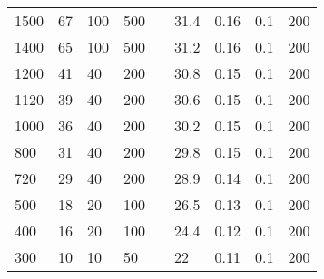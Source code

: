 \documentclass{article}
\begin{document}
\begin{table}[H]
\begin{tabular}{|l|l|l|l|l|l|l|l|l|}
        1500          & 67                        & 100                       & 500                       &  & 31.4       & 0.16                      & 0.1                       & 200                       \\ \cline{1-4} \cline{6-9}
        1400          & 65                        & 100                       & 500                       &  & 31.2       & 0.16                      & 0.1                       & 200                       \\ \cline{1-4} \cline{6-9}
        1200          & 41                        & 40                        & 200                       &  & 30.8       & 0.15                      & 0.1                       & 200                       \\ \cline{1-4} \cline{6-9}
        1120          & 39                        & 40                        & 200                       &  & 30.6       & 0.15                      & 0.1                       & 200                       \\ \cline{1-4} \cline{6-9}
        1000          & 36                        & 40                        & 200                       &  & 30.2       & 0.15                      & 0.1                       & 200                       \\ \cline{1-4} \cline{6-9}
        800           & 31                        & 40                        & 200                       &  & 29.8       & 0.15                      & 0.1                       & 200                       \\ \cline{1-4} \cline{6-9}
        720           & 29                        & 40                        & 200                       &  & 28.9       & 0.14                      & 0.1                       & 200                       \\ \cline{1-4} \cline{6-9}
        500           & 18                        & 20                        & 100                       &  & 26.5       & 0.13                      & 0.1                       & 200                       \\ \cline{1-4} \cline{6-9}
        400           & 16                        & 20                        & 100                       &  & 24.4       & 0.12                      & 0.1                       & 200                       \\ \cline{1-4} \cline{6-9}
        300           & 10                        & 10                        & 50                        &  & 22         & 0.11                      & 0.1                       & 200                       \\ \cline{1-4} \cline{6-9}

\end{tabular}
\end{table}
\end{document}
